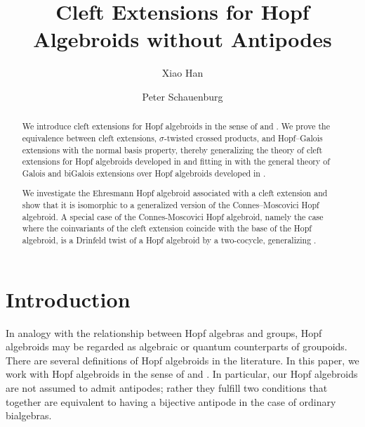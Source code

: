\documentclass[a4paper,reqno]{amsart}
\numberwithin{equation}{section}
\theoremstyle{plain}
\theoremstyle{remark}
\numberwithin{equation}{section}
\begin{document}
\author{Xiao Han}
\address[]{\textit{Xiao Han},
Queen Mary University of London.
}
\author{Peter Schauenburg}
\address{\textit{Peter Schauenburg}, Université Bourgogne Europe, CNRS, IMB UMR 5584, 21000 Dijon, France}




\title{Cleft Extensions for Hopf Algebroids without Antipodes}


\begin{abstract}
We introduce cleft extensions for Hopf algebroids in the sense of \cite{schau1} and \cite{schau3}. We prove the equivalence between cleft extensions, $\sigma$-twisted crossed products, and Hopf--Galois extensions with the normal basis property, thereby generalizing the theory of cleft extensions for Hopf algebroids developed in \cite{BB} and fitting in with the general theory of Galois and biGalois extensions over Hopf algebroids developed in \cite{HS25}. 

We investigate the Ehresmann Hopf algebroid associated with a cleft extension and show that it is isomorphic to a generalized version of the Connes--Moscovici Hopf algebroid. A special case of the Connes-Moscovici Hopf algebroid, namely the case where the coinvariants of the cleft extension coincide with the base of the Hopf algebroid, is a Drinfeld twist of a Hopf algebroid by a two-cocycle, generalizing \cite{Boehm,HM22,HM23}.
\end{abstract}

\maketitle

\section{Introduction}

In analogy with the relationship between Hopf algebras and groups, Hopf algebroids may be regarded as algebraic or quantum counterparts of groupoids. There are several definitions of Hopf algebroids in the literature. In this paper, we work with Hopf algebroids in the sense of \cite{schau1} and \cite{schau3}. In particular, our Hopf algebroids are not assumed to admit antipodes; rather they fulfill two conditions that together are equivalent to having a bijective antipode in the case of ordinary bialgebras. 
\end{document}
